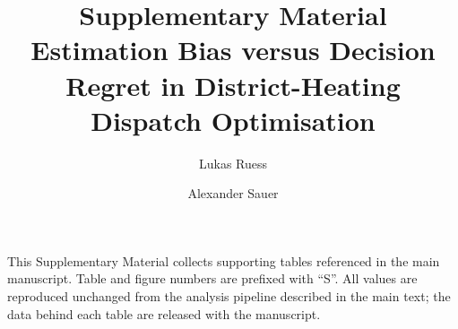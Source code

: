 \documentclass[11pt,a4paper]{article}
\title{Supplementary Material\\[2pt]
  \large Estimation Bias versus Decision Regret in District-Heating Dispatch Optimisation}
\author{Lukas Ruess \and Alexander Sauer}
\date{}
\begin{document}
\maketitle

This Supplementary Material collects supporting tables referenced in the main manuscript.
Table and figure numbers are prefixed with ``S''. All values are reproduced unchanged from
the analysis pipeline described in the main text; the data behind each table are released
with the manuscript.






\end{document}
